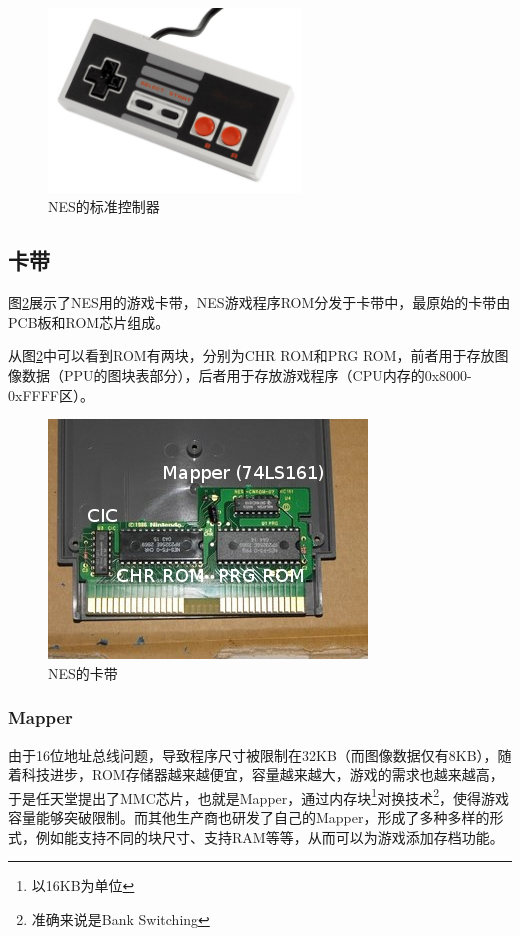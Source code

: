 \documentclass[a4paper]{ltxdoc}
\begin{document}
{\begin{figure}[h]
	\centering
	\includegraphics[width=0.6\textwidth]{images/pad.jpg}
	\caption{NES的标准控制器}
	\label{fig:pad}
\end{figure}

\subsection{卡带}
图\ref{fig:cartridge}展示了NES用的游戏卡带，NES游戏程序ROM分发于卡带中，最原始的卡带由PCB板和ROM芯片组成。

从图\ref{fig:cartridge}中可以看到ROM有两块，分别为CHR ROM和PRG ROM，前者用于存放图像数据（PPU的图块表部分），后者用于存放游戏程序（CPU内存的0x8000-0xFFFF区）。

\begin{figure}[h]
	\centering
	\includegraphics{images/cartridge.jpg}
	\caption{NES的卡带}
	\label{fig:cartridge}
\end{figure}

\subsubsection{Mapper}
由于16位地址总线问题，导致程序尺寸被限制在32KB（而图像数据仅有8KB），随着科技进步，ROM存储器越来越便宜，容量越来越大，游戏的需求也越来越高，于是任天堂提出了MMC芯片，也就是Mapper，通过内存块\footnote{以16KB为单位}对换技术\footnote{准确来说是Bank Switching}，使得游戏容量能够突破限制。而其他生产商也研发了自己的Mapper，形成了多种多样的形式，例如能支持不同的块尺寸、支持RAM等等，从而可以为游戏添加存档功能。

}
\end{document}
